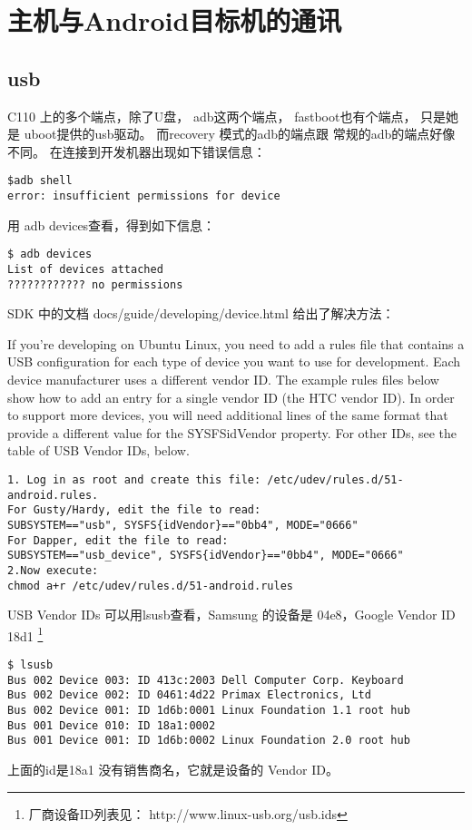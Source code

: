 \documentclass[a4paper,titlepage]{article}
\begin{document}
\section{主机与Android目标机的通讯}
\subsection{usb}
C110 上的多个端点，除了U盘， adb这两个端点， fastboot也有个端点， 只是她是
uboot提供的usb驱动。 而recovery 模式的adb的端点跟 常规的adb的端点好像不同。
在连接到开发机器出现如下错误信息：
\begin{verbatim}
$adb shell
error: insufficient permissions for device 
\end{verbatim}
用 adb devices查看，得到如下信息：
\begin{verbatim}
$ adb devices
List of devices attached
???????????? no permissions
\end{verbatim}

  SDK 中的文档 docs/guide/developing/device.html 给出了解决方法：

If you're developing on Ubuntu Linux, you need to add a rules file that contains a USB configuration for each type of device you want to use for development. Each device manufacturer uses a different vendor ID. The example rules files below show how to add an entry for a single vendor ID (the HTC vendor ID). In order to support more devices, you will need additional lines of the same format that provide a different value for the SYSFS{idVendor} property. For other IDs, see the table of USB Vendor IDs, below.
\begin{verbatim}
1. Log in as root and create this file: /etc/udev/rules.d/51-android.rules.
For Gusty/Hardy, edit the file to read:
SUBSYSTEM=="usb", SYSFS{idVendor}=="0bb4", MODE="0666"
For Dapper, edit the file to read:
SUBSYSTEM=="usb_device", SYSFS{idVendor}=="0bb4", MODE="0666"
2.Now execute:
chmod a+r /etc/udev/rules.d/51-android.rules
\end{verbatim}

USB Vendor IDs 可以用lsusb查看，Samsung 的设备是 04e8，Google Vendor ID 18d1
 \footnote{厂商设备ID列表见： http://www.linux-usb.org/usb.ids}

\begin{verbatim}
$ lsusb
Bus 002 Device 003: ID 413c:2003 Dell Computer Corp. Keyboard
Bus 002 Device 002: ID 0461:4d22 Primax Electronics, Ltd
Bus 002 Device 001: ID 1d6b:0001 Linux Foundation 1.1 root hub
Bus 001 Device 010: ID 18a1:0002
Bus 001 Device 001: ID 1d6b:0002 Linux Foundation 2.0 root hub
\end{verbatim}
上面的id是18a1 没有销售商名，它就是设备的 Vendor ID。                                 
\end{document}
